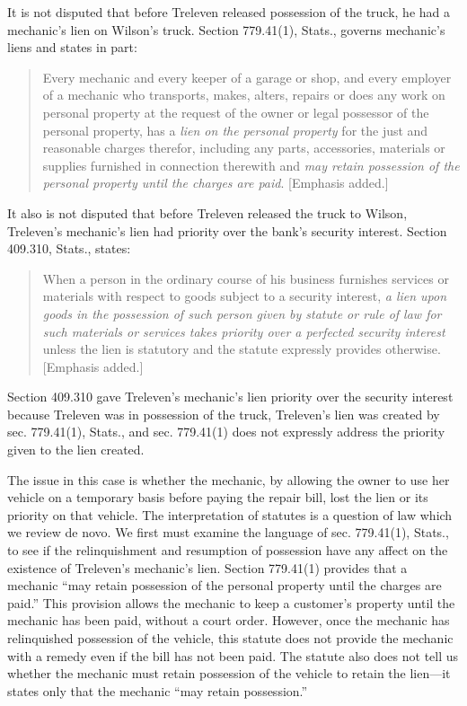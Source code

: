 It is not disputed that before Treleven released possession of the truck, he had
a mechanic's lien on Wilson's truck. Section 779.41(1), Stats., governs
mechanic's liens and states in part:
\begin{quote}
Every mechanic and every keeper of a garage or shop, and every employer of a
mechanic who transports, makes, alters, repairs or does any work on personal
property at the request of the owner or legal possessor of the personal
property, has a \textit{lien on the personal property} for the just and
reasonable charges therefor, including any parts, accessories, materials or
supplies furnished in connection therewith and \textit{may retain possession of
the personal property until the charges are paid}. [Emphasis added.]
\end{quote}
It also is not disputed that before Treleven released the truck to Wilson,
Treleven's mechanic's lien had priority over the bank's security interest.
Section 409.310, Stats., states:
\begin{quote}
When a person in the ordinary course of his business furnishes services or
materials with respect to goods subject to a security interest, \textit{a lien
upon goods in the possession of such person given by statute or rule of law for
such materials or services takes priority over a perfected security interest}
unless the lien is statutory and the statute expressly provides otherwise.
[Emphasis added.]
\end{quote}

Section 409.310 gave Treleven's mechanic's lien priority over the security
interest because Treleven was in possession of the truck, Treleven's lien was
created by sec. 779.41(1), Stats., and sec. 779.41(1) does not expressly
address the priority given to the lien created.

The issue in this case is whether the mechanic, by allowing the owner to use her
vehicle on a temporary basis before paying the repair bill, lost the lien or
its priority on that vehicle. The interpretation of statutes is a question of
law which we review de novo. We first must examine the language of sec.
779.41(1), Stats., to see if the relinquishment and resumption of possession
have any affect on the existence of Treleven's mechanic's lien. Section
779.41(1) provides that a mechanic ``may retain possession of the personal
property until the charges are paid.'' This provision allows the mechanic to
keep a customer's property until the mechanic has been paid, without a court
order. However, once the mechanic has relinquished possession of the vehicle,
this statute does not provide the mechanic with a remedy even if the bill has
not been paid. The statute also does not tell us whether the mechanic must
retain possession of the vehicle to retain the lien---it states only that the
mechanic ``may retain possession.''

